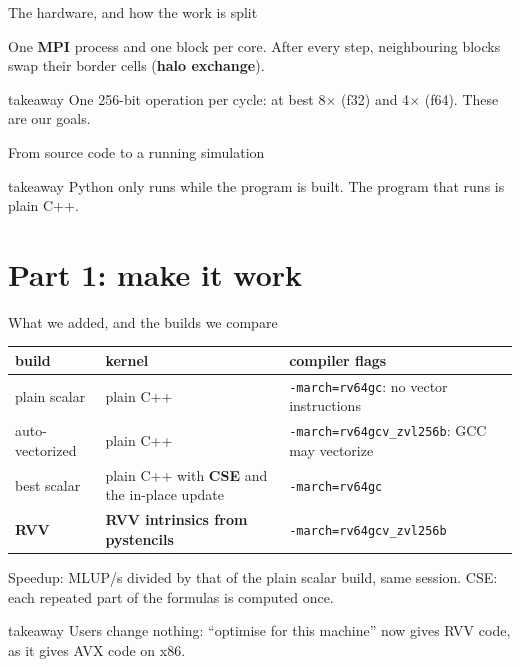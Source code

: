 \documentclass[aspectratio=169,10pt,t]{beamer}
\newcommand{\sx}[1]{#1\ensuremath{\times}} %
\newcommand{\term}[1]{\textcolor{psblue!85!black}{\textbf{#1}}} %
\newcommand{\code}[1]{\texttt{#1}}
\newcommand{\takeaway}[1]{\par\vfill
  \begin{beamercolorbox}[wd=\textwidth,sep=4pt,rounded=true]{takeaway}
    \small #1
  \end{beamercolorbox}}
\begin{document}
\begin{frame}{The hardware, and how the work is split}
  \vspace{3mm}
  \centering

  \vspace{4mm}
  \raggedright
  {\small One \term{MPI} process and one block per core. After every step, neighbouring blocks swap
  their border cells (\term{halo exchange}).\par}
  \takeaway{One 256-bit operation per cycle: at best \sx{8} (f32) and \sx{4} (f64). These are our
    goals.}
\end{frame}

\begin{frame}{From source code to a running simulation}
  \vspace{1mm}
  \centering
  \takeaway{Python only runs while the program is built. The program that runs is plain C++.}
\end{frame}

\section{Part 1: make it work}

\begin{frame}{What we added, and the builds we compare}
  \vspace{2mm}
  \centering

  \vspace{5mm}
  {\footnotesize\renewcommand{\arraystretch}{1.15}
  \begin{tabular}{@{}lll@{}}
    \toprule
    \textbf{build} & \textbf{kernel} & \textbf{compiler flags}\\
    \midrule
    plain scalar & plain C++ & \code{-march=rv64gc}: no vector instructions\\
    auto-vectorized & plain C++ & \code{-march=rv64gcv\_zvl256b}: GCC may vectorize\\
    best scalar & plain C++ with \term{CSE} and the in-place update & \code{-march=rv64gc}\\
    \textbf{RVV} & \textbf{RVV intrinsics from pystencils} & \code{-march=rv64gcv\_zvl256b}\\
    \bottomrule
  \end{tabular}\par}

  \vspace{2mm}
  {\scriptsize\color{psgray}Speedup: MLUP/s divided by that of the plain scalar build, same
  session. CSE: each repeated part of the formulas is computed once.\par}
  \takeaway{Users change nothing: ``optimise for this machine'' now gives RVV code, as it gives AVX
    code on x86.}
\end{frame}
\end{document}
